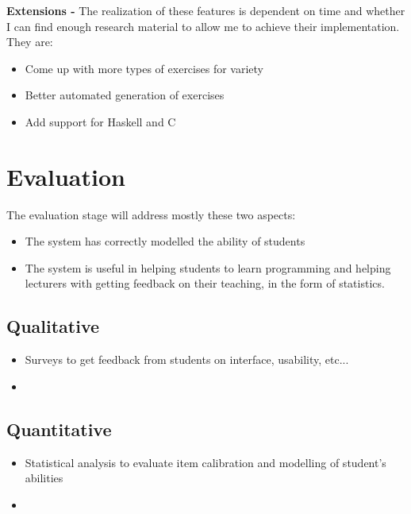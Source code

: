 \documentclass[11pt,a4paper]{report}
\begin{document}
\textbf{Extensions -} The realization of these features is dependent on time and whether I can find enough research material to allow me to achieve their implementation. They are:
\begin{itemize}
\item Come up with more types of exercises for variety
\item Better automated generation of exercises
\item Add support for Haskell and C
\end{itemize}


\chapter{Evaluation}
The evaluation stage will address mostly these two aspects:
\begin{itemize}
\item The system has correctly modelled the ability of students
\item The system is useful in helping students to learn programming and helping lecturers with getting feedback on their teaching, in the form of statistics.
\end{itemize}

\section{Qualitative}
\begin{itemize}
\item Surveys to get feedback from students on interface, usability, etc...
\item 
\end{itemize}

\section{Quantitative}
\begin{itemize}
\item Statistical analysis to evaluate item calibration and modelling of student's abilities
\item 
\end{itemize}



\end{document}
